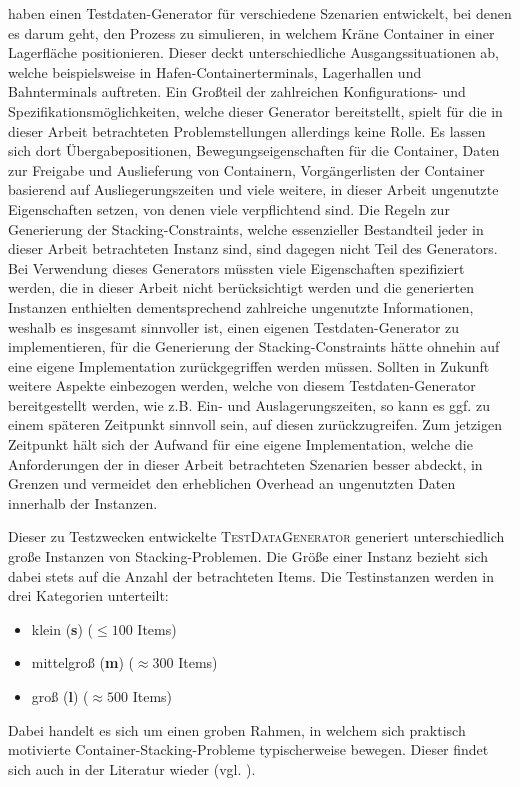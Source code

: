 \citet{Briskorn2018} haben einen Testdaten-Generator für verschiedene Szenarien entwickelt, bei denen
es darum geht, den Prozess zu simulieren, in welchem Kräne Container in einer Lagerfläche positionieren.
Dieser deckt unterschiedliche Ausgangssituationen ab, welche beispielsweise in Hafen-Containerterminals,
Lagerhallen und Bahnterminals auftreten.
Ein Großteil der zahlreichen Konfigurations- und Spezifikationsmöglichkeiten, welche dieser
Generator bereitstellt, spielt für die in dieser Arbeit betrachteten Problemstellungen allerdings keine Rolle.
Es lassen sich dort Übergabepositionen, Bewegungseigenschaften für die Container, Daten zur Freigabe und Auslieferung von
Containern, Vorgängerlisten der Container basierend auf Ausliegerungszeiten und viele weitere, in dieser Arbeit
ungenutzte Eigenschaften setzen, von denen viele verpflichtend sind. Die Regeln zur Generierung der Stacking-Constraints,
welche essenzieller Bestandteil jeder in dieser Arbeit betrachteten Instanz sind, sind dagegen nicht Teil des Generators.
Bei Verwendung dieses Generators müssten viele Eigenschaften spezifiziert werden, die in dieser Arbeit nicht
berücksichtigt werden und die generierten Instanzen enthielten dementsprechend zahlreiche ungenutzte Informationen,
weshalb es insgesamt sinnvoller ist, einen eigenen Testdaten-Generator zu implementieren, für die Generierung der
Stacking-Constraints hätte ohnehin auf eine eigene Implementation zurückgegriffen werden müssen.
Sollten in Zukunft weitere Aspekte einbezogen werden, welche von diesem Testdaten-Generator bereitgestellt
werden, wie z.B. Ein- und Auslagerungszeiten, so kann es ggf. zu einem späteren Zeitpunkt sinnvoll
sein, auf diesen zurückzugreifen. Zum jetzigen Zeitpunkt hält sich der Aufwand für eine eigene Implementation,
welche die Anforderungen der in dieser Arbeit betrachteten Szenarien besser abdeckt, in Grenzen und vermeidet den
erheblichen Overhead an ungenutzten Daten innerhalb der Instanzen.

\vfill
\pagebreak

Dieser zu Testzwecken entwickelte \textsc{TestDataGenerator} generiert unterschiedlich große Instanzen von Stacking-Problemen.
Die Größe einer Instanz bezieht sich dabei stets auf die Anzahl der betrachteten Items. Die Testinstanzen werden
in drei Kategorien unterteilt:
\begin{itemize}
  \item klein (\textbf{s}) ($\leq 100$ Items)
  \item mittelgroß (\textbf{m}) ($\approx 300$ Items)
  \item groß (\textbf{l}) ($\approx 500$ Items)\newline
\end{itemize}
Dabei handelt es sich um einen groben Rahmen, in welchem sich praktisch motivierte Container-Stacking-Probleme
typischerweise bewegen. Dieser findet sich auch in der Literatur wieder (vgl. \citet{Le2016}).

